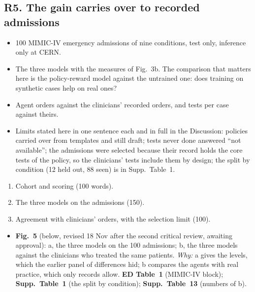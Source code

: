 \subsection{R5. The gain carries over to recorded admissions}\label{sec:transfer}


\content
\begin{itemize}
\item 100 MIMIC-IV emergency admissions of nine conditions, test only, inference only at CERN.
\item The three models with the measures of Fig.~3b. The comparison that matters here is the
policy-reward model against the untrained one: does training on synthetic cases help on real ones?
\item Agent orders against the clinicians' recorded orders, and tests per case against theirs.
\item Limits stated here in one sentence each and in full in the Discussion: policies carried over
from templates and still draft; tests never done answered ``not available''; the admissions were
selected because their record holds the core tests of the policy, so the clinicians' tests include
them by design; the split by condition (12 held out, 88 seen) is in Supp.\ Table~1.
\end{itemize}

\structure
\begin{enumerate}
\item Cohort and scoring (100 words).
\item The three models on the admissions (150).
\item Agreement with clinicians' orders, with the selection limit (100).
\end{enumerate}

\artefacts
\begin{itemize}
\item \textbf{Fig.~5} (below, revised 18 Nov after the second critical review, awaiting approval): a,
the three models on the 100 admissions; b, the three models against the clinicians who treated the
same patients. \emph{Why:} a gives the levels, which the earlier panel of differences hid; b compares
the agents with real practice, which only records allow. \textbf{ED Table~1} (MIMIC-IV block);
\textbf{Supp.\ Table~1} (the split by condition); \textbf{Supp.\ Table~13} (numbers of b).
\end{itemize}

